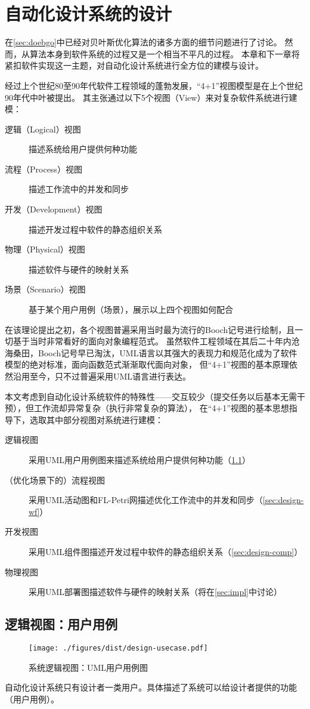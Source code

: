 \documentclass[index]{subfiles}
\begin{document}
\chapter{自动化设计系统的设计}\label{sec:design}
在\cref{sec:doebgo}中已经对贝叶斯优化算法的诸多方面的细节问题进行了讨论。
然而，从算法本身到软件系统的过程又是一个相当不平凡的过程。
本章和下一章将紧扣软件实现这一主题，对自动化设计系统进行全方位的建模与设计。

经过上个世纪80至90年代软件工程领域的蓬勃发展，“4+1”视图模型\cite{kruchten1995}是在上个世纪90年代中叶被提出。
其主张通过以下5个视图（View）来对复杂软件系统进行建模：
\begin{description}
  \item[逻辑（Logical）视图] 描述系统给用户提供何种功能
  \item[流程（Process）视图] 描述工作流中的并发和同步
  \item[开发（Development）视图] 描述开发过程中软件的静态组织关系
  \item[物理（Physical）视图] 描述软件与硬件的映射关系
  \item[场景（Scenario）视图] 基于某个用户用例（场景），展示以上四个视图如何配合
\end{description}

在该理论提出之初，各个视图普遍采用当时最为流行的Booch记号进行绘制，且一切基于当时非常看好的面向对象编程范式。
虽然软件工程领域在其后二十年内沧海桑田，Booch记号早已淘汰，UML语言以其强大的表现力和规范化成为了软件模型的绝对标准，面向函数范式渐渐取代面向对象，
但“4+1”视图的基本原理依然沿用至今，只不过普遍采用UML语言进行表达。

本文考虑到自动化设计系统软件的特殊性——交互较少（提交任务以后基本无需干预），但工作流却异常复杂（执行非常复杂的算法），
在“4+1”视图的基本思想指导下，选取其中部分视图对系统进行建模：
\begin{description}
  \item[逻辑视图] 采用UML用户用例图来描述系统给用户提供何种功能（\cref{sec:design-usecase}）
  \item[（优化场景下的）流程视图] 采用UML活动图和FL-Petri网描述优化工作流中的并发和同步（\cref{sec:design-wf}）
  \item[开发视图] 采用UML组件图描述开发过程中软件的静态组织关系（\cref{sec:design-comp}）
  \item[物理视图] 采用UML部署图描述软件与硬件的映射关系（将在\cref{sec:impl}中讨论）
\end{description}

\section{逻辑视图：用户用例}\label{sec:design-usecase}
\begin{figure}[h]
  \centering
  \texttt{[image: ./figures/dist/design-usecase.pdf]}
  \caption{系统逻辑视图：UML用户用例图\label{fig:design-usecase}}
\end{figure}
自动化设计系统只有设计者一类用户。具体描述了系统可以给设计者提供的功能（用户用例）。
\end{document}
